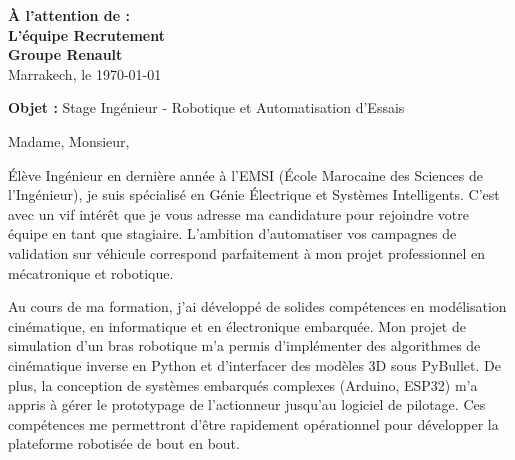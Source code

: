 \documentclass[10pt,a4paper]{../../altacv}
\makeatletter
\renewcommand{\makecvheader}{%
  \begingroup
    \raggedright\color{emphasis}%
    {\Huge\bfseries\MakeUppercase{\@name}\par}
    \medskip
    {\large\bfseries\color{accent}\@tagline\par}
    \medskip
    {\footnotesize\bfseries\@personalinfo\par}
  \endgroup\medskip
}
\makeatother
\begin{document}

\makecvheader

\bigskip
\medskip

\begin{flushright}
  {\color{emphasis}\textbf{À l'attention de :}} \\[2pt]
  \textbf{L'équipe Recrutement} \\
  \textbf{Groupe Renault} \\[20pt]
  Marrakech, le \today
\end{flushright}
\bigskip

\bigskip

{\color{accent}\textbf{Objet :}} Stage Ingénieur - Robotique et Automatisation d'Essais

\bigskip\bigskip

Madame, Monsieur,

\vspace{0.4cm}

Élève Ingénieur en dernière année à l'EMSI (École Marocaine des Sciences de l'Ingénieur), je suis spécialisé en Génie Électrique et Systèmes Intelligents. C'est avec un vif intérêt que je vous adresse ma candidature pour rejoindre votre équipe en tant que stagiaire. L'ambition d'automatiser vos campagnes de validation sur véhicule correspond parfaitement à mon projet professionnel en mécatronique et robotique.

\vspace{0.4cm}

Au cours de ma formation, j'ai développé de solides compétences en modélisation cinématique, en informatique et en électronique embarquée. Mon projet de simulation d'un bras robotique m'a permis d'implémenter des algorithmes de cinématique inverse en Python et d'interfacer des modèles 3D sous PyBullet. De plus, la conception de systèmes embarqués complexes (Arduino, ESP32) m'a appris à gérer le prototypage de l'actionneur jusqu'au logiciel de pilotage. Ces compétences me permettront d'être rapidement opérationnel pour développer la plateforme robotisée de bout en bout.
\end{document}
